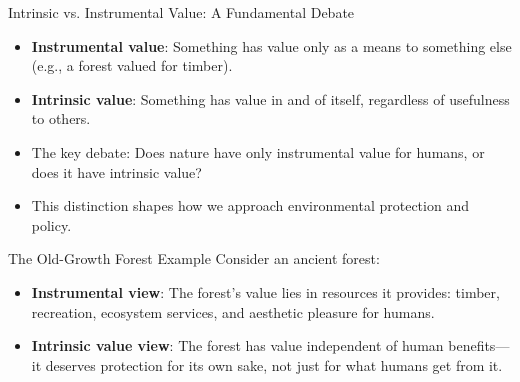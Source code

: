 \documentclass{beamer}
\begin{document}
	\begin{frame}{Intrinsic vs. Instrumental Value: A Fundamental Debate}
		\begin{itemize}
			\item \textbf{Instrumental value}: Something has value only as a means to something else (e.g., a forest valued for timber).
			\item \textbf{Intrinsic value}: Something has value in and of itself, regardless of usefulness to others.
			\item The key debate: Does nature have only instrumental value for humans, or does it have intrinsic value?
			\item This distinction shapes how we approach environmental protection and policy.
		\end{itemize}
		
		\begin{example}{The Old-Growth Forest Example}
			Consider an ancient forest:
			\begin{itemize}
				\item \textbf{Instrumental view}: The forest's value lies in resources it provides: timber, recreation, ecosystem services, and aesthetic pleasure for humans.
				\item \textbf{Intrinsic value view}: The forest has value independent of human benefits—it deserves protection for its own sake, not just for what humans get from it.
			\end{itemize}
		\end{example}
	\end{frame}
	
\end{document}
